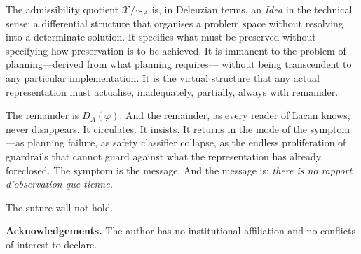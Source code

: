 \documentclass[10pt,a4paper]{article}
\begin{document}
The admissibility quotient $\mathcal{X}/{\sim_A}$ is, in Deleuzian terms, an
\emph{Idea} in the technical sense: a differential structure that organises a
problem space without resolving into a determinate solution. It specifies what
must be preserved without specifying how preservation is to be achieved. It is
immanent to the problem of planning---derived from what planning requires---
without being transcendent to any particular implementation. It is the virtual
structure that any actual representation must actualise, inadequately, partially,
always with remainder.

The remainder is $D_A(\varphi)$. And the remainder, as every reader of Lacan
knows, never disappears. It circulates. It insists. It returns in the mode of
the symptom---as planning failure, as safety classifier collapse, as the
endless proliferation of guardrails that cannot guard against what the
representation has already foreclosed. The symptom is the message. And the
message is: \emph{there is no rapport d'observation que tienne.}

The suture will not hold.

\bigskip
\noindent\textbf{Acknowledgements.} The author has no institutional affiliation
and no conflicts of interest to declare.
\end{document}
